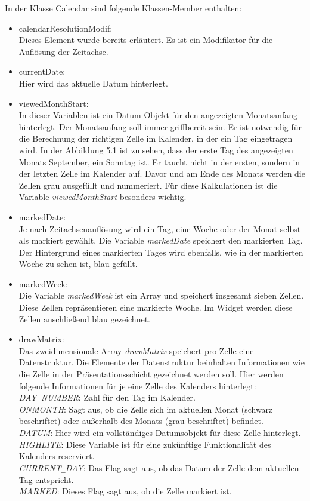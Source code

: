 In der Klasse Calendar sind folgende Klassen-Member enthalten:
\begin{itemize}
 \item calendarResolutionModif:\\
 Dieses Element wurde bereits erl\"autert. Es ist ein Modifikator f\"ur die Aufl\"osung der Zeitachse.
 
 \item currentDate:\\
 Hier wird das aktuelle Datum hinterlegt. 
 
 \item viewedMonthStart:\\
 In dieser Variablen ist ein Datum-Objekt f\"ur den angezeigten Monatsanfang hinterlegt.
 Der Monatsanfang soll immer griffbereit sein.
 Er ist notwendig f\"ur die Berechnung der richtigen Zelle im Kalender, in der ein Tag eingetragen wird.
 In der Abbildung 5.1 ist zu sehen,
 dass der erste Tag des angezeigten Monats September, ein Sonntag ist.
 Er taucht nicht in der ersten, sondern in der letzten Zelle im Kalender auf.
 Davor und am Ende des Monats werden die Zellen grau ausgef\"ullt und nummeriert.
 F\"ur diese Kalkulationen ist die Variable \emph{viewedMonthStart} besonders wichtig.
 
 \item markedDate:\\
 Je nach Zeitachsenaufl\"osung wird ein Tag, eine Woche oder der Monat selbst als markiert gew\"ahlt.
 Die Variable \emph{markedDate} speichert den markierten Tag.
 Der Hintergrund eines markierten Tages wird ebenfalls, wie in der markierten Woche zu sehen ist, 
 blau gef\"ullt.
 
 \item markedWeek:\\
 Die Variable \emph{markedWeek} ist ein Array und speichert insgesamt sieben Zellen.
 Diese Zellen repr\"asentieren eine markierte Woche.
 Im Widget werden diese Zellen anschlie\ss{}end blau gezeichnet.
 
 \item drawMatrix:\\
 Das zweidimensionale Array \emph{drawMatrix} speichert pro Zelle eine Datenstruktur.
 Die Elemente der Datenstruktur beinhalten Informationen 
 wie die Zelle in der Pr\"asentationsschicht gezeichnet werden soll.
 Hier werden folgende Informationen f\"ur je eine Zelle des Kalenders hinterlegt:\\
 \emph{DAY\texttt{\_}NUMBER}: Zahl f\"ur den Tag im Kalender.\\
 \emph{ONMONTH}: Sagt aus, ob die Zelle sich im aktuellen Monat (schwarz beschriftet) oder 
 au\ss{}erhalb des Monats (grau beschriftet) befindet.\\
 \emph{DATUM}: Hier wird ein vollst\"andiges Datumsobjekt f\"ur diese Zelle hinterlegt.\\
 \emph{HIGHLITE}: Diese Variable ist f\"ur eine zuk\"unftige Funktionalit\"at des Kalenders reserviert.\\
 \emph{CURRENT\texttt{\_}DAY}: Das Flag sagt aus, ob das Datum der Zelle dem aktuellen Tag entspricht.\\
 \emph{MARKED}: Dieses Flag sagt aus, ob die Zelle markiert ist.\\
 

\end{itemize}
